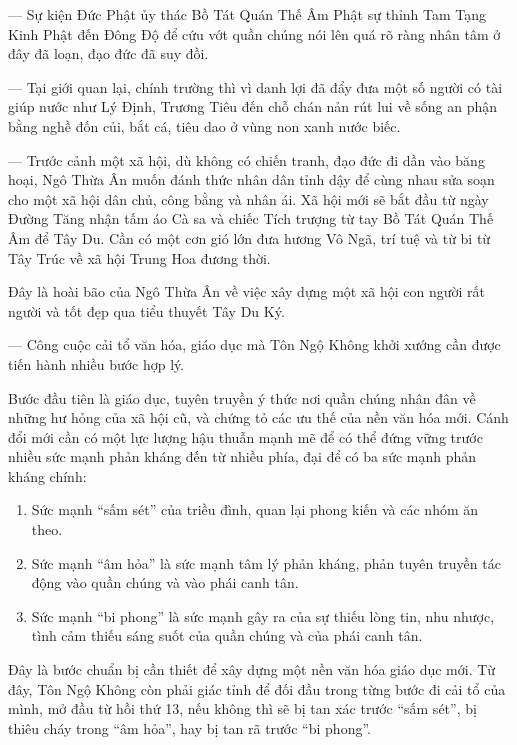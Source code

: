 — Sự kiện Đức Phật ủy thác Bồ Tát Quán Thế Âm Phật sự thỉnh Tam Tạng Kinh Phật đến Đông Độ để cứu vớt quần chúng nói lên quá rõ ràng nhân tâm ở đây đã loạn, đạo đức đã suy đồi.

— Tại giới quan lại, chính trường thì vì danh lợi đã đẩy đưa một số người có tài giúp nước như Lý Định, Trương Tiêu đến chỗ chán nản rút lui về sống an phận bằng nghề đốn củi, bắt cá, tiêu dao ở vùng non xanh nước biếc.

— Trước cảnh một xã hội, dù không có chiến tranh, đạo đức đi dần vào băng hoại, Ngô Thừa Ân muốn đánh thức nhân dân tỉnh dậy để cùng nhau sửa soạn cho một xã hội dân chủ, công bằng và nhân ái. Xã hội mới sẽ bắt đầu từ ngày Đường Tăng nhận tấm áo Cà sa và chiếc Tích trượng từ tay Bồ Tát Quán Thế Âm để Tây Du. Cần có một cơn gió lớn đưa hương Vô Ngã, trí tuệ và từ bi từ Tây Trúc về xã hội Trung Hoa đương thời.

Đây là hoài bão của Ngô Thừa Ân về việc xây dựng một xã hội con người rất người và tốt đẹp qua tiểu thuyết Tây Du Ký.

— Công cuộc cải tổ văn hóa, giáo dục mà Tôn Ngộ Không khởi xướng cần được tiến hành nhiều bước hợp lý.

Bước đầu tiên là giáo dục, tuyên truyền ý thức nơi quần chúng nhân đân về những hư hỏng của xã hội cũ, và chứng tỏ các ưu thế của nền văn hóa mới. Cánh đổi mới cần có một lực lượng hậu thuẫn mạnh mẽ để có thể đứng vững trước nhiều sức mạnh phản kháng đến từ nhiều phía, đại để có ba sức mạnh phản kháng chính:

\begin{enumerate}[label=\itshape\arabic*\upshape/]
    \item Sức mạnh ``sấm sét'' của triều đình, quan lại phong kiến và các nhóm ăn theo.

    \item Sức mạnh ``âm hỏa'' là sức mạnh tâm lý phản kháng, phản tuyên truyền tác động vào quần chúng và vào phái canh tân.

    \item Sức mạnh ``bi phong'' là sức mạnh gây ra của sự thiếu lòng tin, nhu nhược, tình cảm thiếu sáng suốt của quần chúng và của phái canh tân.
\end{enumerate}

Đây là bước chuẩn bị cần thiết để xây dựng một nền văn hóa giáo dục mới. Từ đây, Tôn Ngộ Không còn phải giác tỉnh để đối đầu trong từng bước đi cải tổ của mình, mở đầu từ hồi thứ 13, nếu không thì sẽ bị tan xác trước ``sấm sét'', bị thiêu cháy trong ``âm hỏa'', hay bị tan rã trước ``bi phong''.

